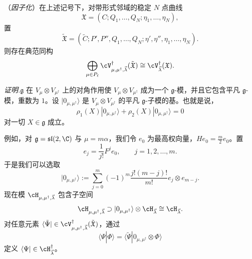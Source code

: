 
\begin{theorem}[3.19]
（\emph{因子化}）在上述记号下，对带形式邻域的稳定 $N$ 点曲线
\[
\mathfrak{X}=(C;Q_1,\dots,Q_N;\eta_1,\dots,\eta_N),
\]
置
\[
\tilde{\mathfrak{X}}=(\tilde{C};P',P'',Q_1,\dots,Q_N;
\eta',\eta'',\eta_1,\dots,\eta_N).
\]
则存在典范同构
\[
\bigoplus_{\mu\in P_\ell}\cV^{\dagger}_{\mu,\mu^{\dagger},\vec{\lambda}}
(\tilde{\mathfrak{X}})\cong\cV^{\dagger}_{\vec{\lambda}}(\mathfrak{X}).
\]
\end{theorem}

\noindent\textit{证明.}\quad $\mathfrak{g}$ 在 $V_\mu\otimes V_{\mu^{\dagger}}$ 上的对角作用使
$V_\mu\otimes V_{\mu^{\dagger}}$ 成为一个 $\mathfrak{g}$-模，并且它包含平凡
$\mathfrak{g}$-模，重数为 $1$。设 $|0_{\mu,\mu^{\dagger}}\rangle$ 是
$V_\mu\otimes V_{\mu^{\dagger}}$ 的平凡 $\mathfrak{g}$-子模的基。也就是说，
\[
\rho_1(X)|0_{\mu,\mu^{\dagger}}\rangle
+\rho_2(X)|0_{\mu,\mu^{\dagger}}\rangle=0
\]
对一切 $X\in\mathfrak{g}$ 成立。

例如，对 $\mathfrak{g}=\mathfrak{sl}(2,\C)$ 与 $\mu=m\alpha$，我们令
$e_0$ 为最高权向量，$He_0=\frac{m}{2}e_0$。置
\[
e_j=\frac{1}{j!}F^{j}e_0,\qquad j=1,2,\dots,m.
\]
于是我们可以选取
\[
|0_{\mu,\mu^{\dagger}}\rangle:=\sum_{j=0}^{m}(-1)^{m}
\frac{j!(m-j)!}{m!}e_j\otimes e_{m-j}.
\]
现在模 $\cH_{\mu,\mu^{\dagger},\vec{\lambda}}$ 包含子空间
\[
\cH_{\mu,\mu^{\dagger},\vec{\lambda}}\supset
|0_{\mu,\mu^{\dagger}}\rangle\otimes\cH_{\vec{\lambda}}
\cong\cH_{\vec{\lambda}}.
\]
对任意元素
$\langle\tilde\Psi|\in\cV^{\dagger}_{\mu,\mu^{\dagger},\vec{\lambda}}
(\tilde{\mathfrak{X}})$，通过
\[
\langle\Psi|\Phi\rangle
=\langle\tilde\Psi|0_{\mu,\mu^{\dagger}}\otimes\Phi\rangle
\]
定义 $\langle\Psi|\in\cH^{\dagger}_{\vec{\lambda}}$。


